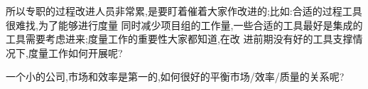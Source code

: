\documentclass[11pt]{article}
\begin{document}
\begin{myquote}
所以专职的过程改进人员非常累,是要盯着催着大家作改进的;比如:合适的过程工具很难找,为了能够进行度量
同时减少项目组的工作量,一些合适的工具最好是集成的工具需要考虑进来;度量工作的重要性大家都知道,在改
进前期没有好的工具支撑情况下,度量工作如何开展呢?
\end{myquote}

\begin{comment}
我说过很多次,在我的工作生涯之中,很多事情是用手做的。因为这样,我学习到很多道理。就好像我们
  没有计算器,就只能背九因歌,没有MS Project就用手画。在明白了过程的其中奥妙之后,才可能选择正确有用的
  工具,否则工具永远都会是一个发散的讨论议题,让人不能专心于业务,开发出来的工具,也不会很好用,好像
  我们的情况一样。


  其实真正的困难,在于我们还不知道如何应用度量的概念,不是在于没有工具。如果我们知道度量的重要性,我
  们就有决心的解决度量的应用问题。从每个人的效率开始,从会议的效率问题开始,这些都不需要很多工具。这
  样可以建立度量意识。需要时间。但没有这个意识,工具是一定没用的。

  问题是,我们要坚持一段时间,让大家可以知道项目的部分活动的效率,先尝尝一些甜头。但是大家其实说这知
  道度量的重要性,但往往拒绝能够建立度量体系的成功必由之路。

  任何改进,开始一定会有一点效率下降的。这个是要决心的。我们的单维思维,就不容许这个短暂的损失。没有
  投入,就不能有回报。
\end{comment}

\begin{myquote}
一个小的公司,市场和效率是第一的,如何很好的平衡市场/效率/质量的关系呢?
\end{myquote}

\begin{comment}
简单到不能再简单。要有效,需要大概8-10\%的资源分配到长远发展的活动,如过程改进等。分配好的资
源,就要好好地利用在改进,不能临时用于业务,如要求QA做项目的事情。8-10\%的资源,包括项目大概4-6\%的
资源,用于改进。就是说,大概4\%的组织资源,是实实在在的EPG组织的资源。

进度要求要有足够耐心。效果是慢慢出现的。分配少于这个,效果不会好,因为都只能做形式的东西。

我的经验是,我们的领导,我们的管理理念,是不认同这样的理念的。他们希望不用改变思维,只拿一些招数,如
每日构建、代码走查、等等。

这个理念认为这不单单是可能的,而且是正当的方法。但是要持续地发展这些招数,也是需要管理理念的改变的。
同时进度也不见得快。反而如果过程管理理念成熟,能够得到的效率(生产力)提高,是成倍增长的。

这里授人以渔是不被重视的,因为大家都只是关注于鱼。这个就好像买东西,又要不付钱,又要拿到好东西,这个
只能是偷而已。但是``知识、经验''是偷不来的。可惜,可惜!
\end{comment}
\end{document}
